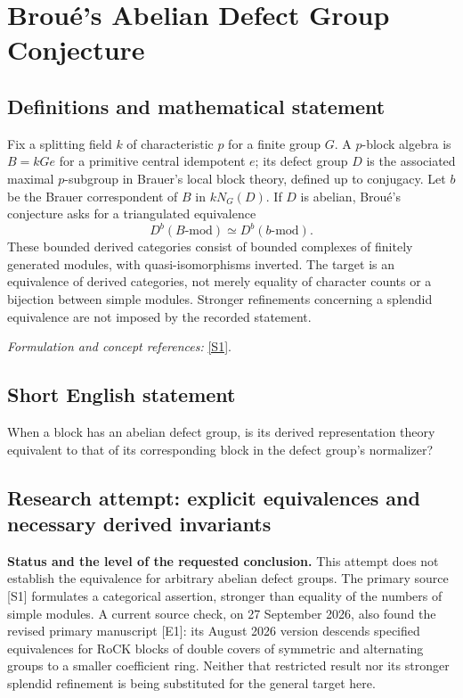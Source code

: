 \documentclass[11pt]{article}
\begin{document}
\section*{\texorpdfstring{Broué's Abelian Defect Group Conjecture}{Broué's Abelian Defect Group Conjecture}}\label{statement}
\subsection{Definitions and mathematical statement}
Fix a splitting field $k$ of characteristic $p$ for a finite group $G$. A $p$-block algebra is $B=kGe$ for a primitive central idempotent $e$; its defect group $D$ is the associated maximal $p$-subgroup in Brauer's local block theory, defined up to conjugacy. Let $b$ be the Brauer correspondent of $B$ in $kN_G(D)$. If $D$ is abelian, Brou\'e's conjecture asks for a triangulated equivalence
\[
 D^b(B\text{-}\mathrm{mod})\simeq D^b(b\text{-}\mathrm{mod}).
\]
These bounded derived categories consist of bounded complexes of finitely generated modules, with quasi-isomorphisms inverted. The target is an equivalence of derived categories, not merely equality of character counts or a bijection between simple modules. Stronger refinements concerning a splendid equivalence are not imposed by the recorded statement.
\par\smallskip\textit{Formulation and concept references:} \href{http://www.numdam.org/item/AST_1990__181-182__61_0/}{[S1]}.

\subsection{Short English statement}
When a block has an abelian defect group, is its derived representation theory equivalent to that of its corresponding block in the defect group's normalizer?
\subsection{Research attempt: explicit equivalences and necessary derived invariants}
\textbf{Status and the level of the requested conclusion.} This attempt does not establish the equivalence for arbitrary abelian defect groups. The primary source [S1] formulates a categorical assertion, stronger than equality of the numbers of simple modules. A current source check, on 27 September 2026, also found the revised primary manuscript [E1]: its August 2026 version descends specified equivalences for RoCK blocks of double covers of symmetric and alternating groups to a smaller coefficient ring. Neither that restricted result nor its stronger splendid refinement is being substituted for the general target here.
\end{document}
